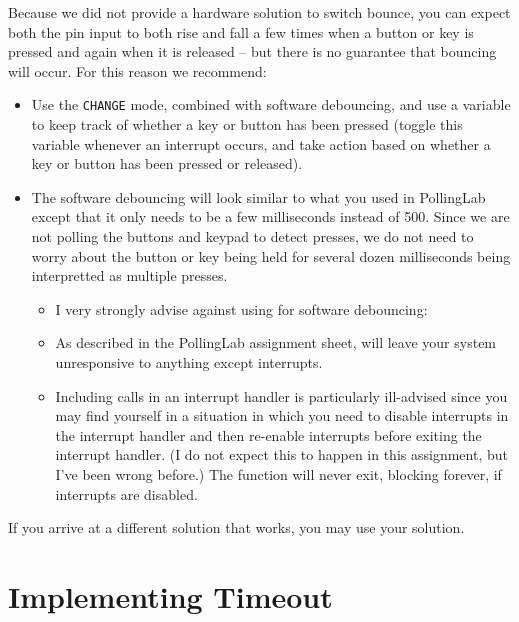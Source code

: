 Because we did not provide a hardware solution to switch bounce, you can expect
both the pin input to both rise and fall a few times when a button or key is
pressed and again when it is released -- but there is no guarantee that
bouncing will occur. For this reason we recommend:
    \begin{itemize}
    \item Use the \lstinline{CHANGE} mode, combined with software debouncing,
        and use a variable to keep track of whether a key or button has been
        pressed (toggle this variable whenever an interrupt occurs, and take
        action based on whether a key or button has been pressed or released).
    \item The software debouncing will look similar to what you used in
        PollingLab except that it only needs to be a few milliseconds instead
        of 500. Since we are not polling the buttons and keypad to detect
        presses, we do not need to worry about the button or key being held for
        several dozen milliseconds being interpretted as multiple presses.
        \begin{itemize}
        \item I very strongly advise against using  for
            software debouncing:
        \item As described in the PollingLab assignment sheet,
             will leave your system unresponsive to anything
            except interrupts.
        \item Including  calls in an interrupt handler is
            particularly ill-advised since you may find yourself in a situation
            in which you need to disable interrupts in the interrupt handler
            and then re-enable interrupts before exiting the interrupt handler.
            (I do not expect this to happen in this assignment, but I've been
            wrong before.) The  function will never exit,
            blocking forever, if interrupts are disabled.
        \end{itemize}
    \end{itemize}
If you arrive at a different solution that works, you may use your solution.



\section{Implementing Timeout}\label{sec:TimerInterrupts}

